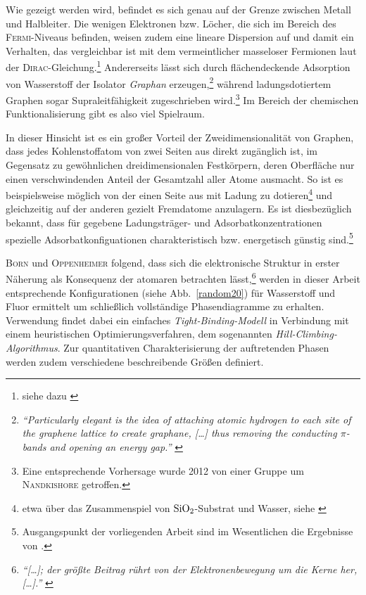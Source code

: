 \documentclass[a4paper, 10pt, twoside, openany]{book} %
\begin{document}
	Wie gezeigt werden wird, befindet es sich genau auf der Grenze zwischen Metall und Halbleiter. Die wenigen Elektronen bzw. Löcher, die sich im Bereich des \textsc{Fermi}-Niveaus befinden, weisen zudem eine lineare Dispersion auf und damit ein Verhalten, das vergleichbar ist mit dem vermeintlicher masseloser Fermionen laut der \textsc{Dirac}-Gleichung.\footnote{siehe dazu \cite[Abschnitt III]{Katsnelson2}} Andererseits lässt sich durch flächendeckende Adsorption von Wasserstoff der Isolator \emph{Graphan} erzeugen,\footnote{\emph{"`Particularly elegant is the idea of attaching atomic hydrogen to each site of the graphene lattice to create graphane, \emph{[\dots]} thus removing the conducting $\pi$-bands and opening an energy gap."'} \cite[S.~610]{Elias}} während ladungsdotiertem Graphen sogar Supraleitfähigkeit zugeschrieben wird.\footnote{Eine entsprechende Vorhersage wurde 2012 von einer Gruppe um \textsc{Nandkishore} \cite{Nandkishore} getroffen.} Im Bereich der chemischen Funktionalisierung gibt es also viel Spielraum.
	
	In dieser Hinsicht ist es ein großer Vorteil der Zweidimensionalität von Graphen, dass jedes Kohlenstoffatom von zwei Seiten aus direkt zugänglich ist, im Gegensatz zu gewöhnlichen dreidimensionalen Festkörpern, deren Oberfläche nur einen verschwindenden Anteil der Gesamtzahl aller Atome ausmacht. So ist es beispielsweise möglich von der einen Seite aus mit Ladung zu dotieren\footnote{etwa über das Zusammenspiel von $\rm SiO_2$-Substrat und Wasser, siehe \cite{Wehling1}} und gleichzeitig auf der anderen gezielt Fremdatome anzulagern. Es ist diesbezüglich bekannt, dass für gegebene Ladungsträger- und Adsorbatkonzentrationen spezielle Adsorbatkonfiguationen charakteristisch bzw. energetisch günstig sind.\footnote{Ausgangspunkt der vorliegenden Arbeit sind im Wesentlichen die Ergebnisse von \cite{Wehling2}.}
	
	\textsc{Born} und \textsc{Oppenheimer} folgend, dass sich die elektronische Struktur in erster Näherung als Konsequenz der atomaren betrachten lässt,\footnote{\emph{"`\emph{[\dots]}; der größte Beitrag rührt von der Elektronenbewegung um die Kerne her, \emph{[\dots]}."'} \cite[S.~457]{Born}} werden in dieser Arbeit entsprechende Konfigurationen (siehe Abb.~\ref{random20}) für Wasserstoff und Fluor ermittelt um schließlich vollständige Phasendiagramme zu erhalten. Verwendung findet dabei ein einfaches \emph{Tight-Binding-Modell} in Verbindung mit einem heuristischen Optimierungsverfahren, dem sogenannten \emph{Hill-Climbing-Algorithmus}. Zur quantitativen Charakterisierung der auftretenden Phasen werden zudem verschiedene beschreibende Größen definiert.
	
\end{document}
